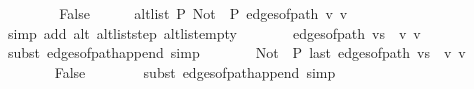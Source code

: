 \begin{isabellebody}
\ \ \isamarkupfalse%
\isanewline
\ \ \ \ \isamarkupfalse%
\ False\isanewline
\ \ \ \ \isamarkupfalse%
\ {\isachardoublequoteopen}alt{\isacharunderscore}{\kern0pt}list\ P\ {\isacharparenleft}{\kern0pt}Not\ {\isasymcirc}\ P{\isacharparenright}{\kern0pt}\ {\isacharparenleft}{\kern0pt}edges{\isacharunderscore}{\kern0pt}of{\isacharunderscore}{\kern0pt}path\ {\isacharbrackleft}{\kern0pt}v{\isacharprime}{\kern0pt}{\isacharcomma}{\kern0pt}\ v{\isacharbrackright}{\kern0pt}{\isacharparenright}{\kern0pt}{\isachardoublequoteclose}\isanewline
\ \ \ \ \ \ \isamarkupfalse%
\ {\isacharparenleft}{\kern0pt}simp\ add{\isacharcolon}{\kern0pt}\ alt\ alt{\isacharunderscore}{\kern0pt}list{\isacharunderscore}{\kern0pt}step\ alt{\isacharunderscore}{\kern0pt}list{\isacharunderscore}{\kern0pt}empty{\isacharparenright}{\kern0pt}\isanewline
\ \ \ \ \isamarkupfalse%
\ \isamarkupfalse%
\ {\isachardoublequoteopen}edges{\isacharunderscore}{\kern0pt}of{\isacharunderscore}{\kern0pt}path\ {\isacharparenleft}{\kern0pt}vs\ {\isacharat}{\kern0pt}\ {\isacharbrackleft}{\kern0pt}v{\isacharprime}{\kern0pt}{\isacharprime}{\kern0pt}{\isacharcomma}{\kern0pt}\ v{\isacharprime}{\kern0pt}{\isacharbrackright}{\kern0pt}{\isacharparenright}{\kern0pt}\ {\isasymnoteq}\ {\isacharbrackleft}{\kern0pt}{\isacharbrackright}{\kern0pt}{\isachardoublequoteclose}\isanewline
\ \ \ \ \ \ \isamarkupfalse%
\ {\isacharparenleft}{\kern0pt}subst\ edges{\isacharunderscore}{\kern0pt}of{\isacharunderscore}{\kern0pt}path{\isacharunderscore}{\kern0pt}append{\isacharunderscore}{\kern0pt}{}{\isacharparenright}{\kern0pt}\ simp{\isacharplus}{\kern0pt}\isanewline
\ \ \ \ \isamarkupfalse%
\ \isamarkupfalse%
\ {\isachardoublequoteopen}{\isacharparenleft}{\kern0pt}Not\ {\isasymcirc}\ P{\isacharparenright}{\kern0pt}\ {\isacharparenleft}{\kern0pt}last\ {\isacharparenleft}{\kern0pt}edges{\isacharunderscore}{\kern0pt}of{\isacharunderscore}{\kern0pt}path\ {\isacharparenleft}{\kern0pt}vs\ {\isacharat}{\kern0pt}\ {\isacharbrackleft}{\kern0pt}v{\isacharprime}{\kern0pt}{\isacharprime}{\kern0pt}{\isacharcomma}{\kern0pt}\ v{\isacharprime}{\kern0pt}{\isacharbrackright}{\kern0pt}{\isacharparenright}{\kern0pt}{\isacharparenright}{\kern0pt}{\isacharparenright}{\kern0pt}{\isachardoublequoteclose}\isanewline
\ \ \ \ \ \ \isamarkupfalse%
\ False\isanewline
\ \ \ \ \ \ \isamarkupfalse%
\ {\isacharparenleft}{\kern0pt}subst\ edges{\isacharunderscore}{\kern0pt}of{\isacharunderscore}{\kern0pt}path{\isacharunderscore}{\kern0pt}append{\isacharunderscore}{\kern0pt}{}{\isacharparenright}{\kern0pt}\ simp{\isacharplus}{\kern0pt}\isanewline

\end{isabellebody}
